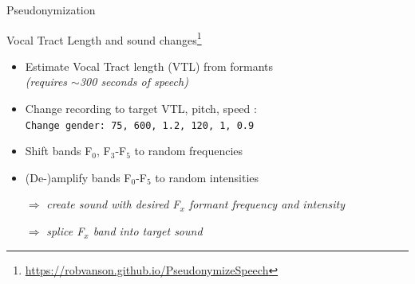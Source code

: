 \documentclass[xcolor={dvipsnames}]{beamer}
\begin{document}
\begin{frame}{Pseudonymization}

    \begin{figure}[htb]
        \centering
    \end{figure}

\end{frame}

\begin{frame}{Vocal Tract Length and sound changes\footnote[1]{\scriptsize{\url{ https://robvanson.github.io/PseudonymizeSpeech}}}}

\begin{itemize}
    \item Estimate Vocal Tract length (VTL) from formants \cite{lammert_short-time_2015}\\
          \textit{(requires $\sim$300 seconds of speech)}
    \item Change recording to target VTL, pitch, speed \cite{boersma_praat:_2017}: \\
            {\texttt{Change gender: 75, 600, 1.2, 120, 1, 0.9}}
    \item Shift bands F$_0$, F$_3$-F$_5$ to random frequencies
    \item (De-)amplify bands F$_0$-F$_5$ to random intensities
    \item[$\Rightarrow$] \textit{create sound with desired F$_x$ formant frequency and intensity}
    \item[$\Rightarrow$] \textit{splice F$_x$ band into target sound}
\end{itemize}

\end{frame}
\end{document}
